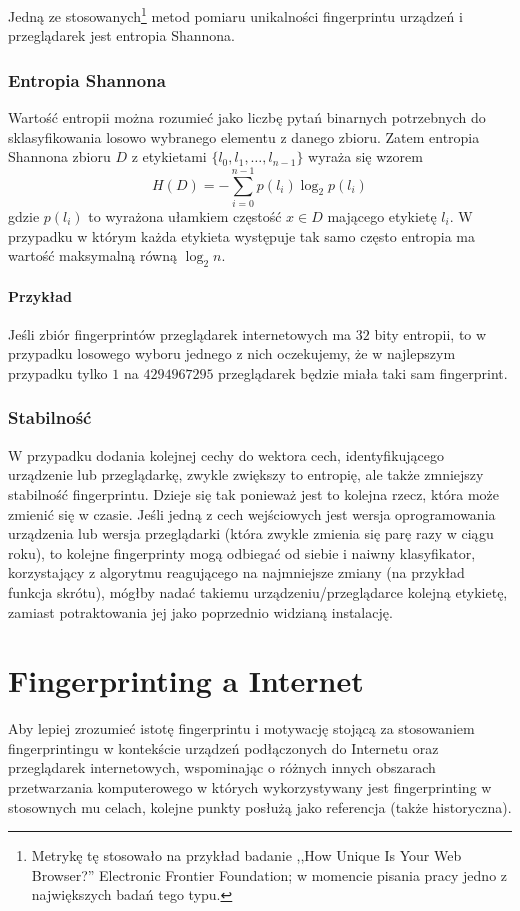 Jedną ze stosowanych\footnote{Metrykę tę stosowało na przykład badanie ,,How
	Unique Is Your Web Browser?'' Electronic Frontier Foundation; w momencie
pisania pracy jedno z największych badań tego typu.} metod pomiaru unikalności
fingerprintu urządzeń i przeglądarek jest entropia Shannona.

\subsubsection{Entropia Shannona}
Wartość entropii można rozumieć jako liczbę pytań binarnych potrzebnych do
sklasyfikowania losowo wybranego elementu z danego zbioru. Zatem entropia
Shannona zbioru \(D\) z etykietami \(\{l_{0}, l_{1}, \dots, l_{n - 1}\}\) wyraża
się wzorem \[H(D) = -{\sum_{i = 0}^{n - 1}{p(l_{i})\log_{2}{p(l_{i})}}}\] gdzie
\(p(l_{i})\) to wyrażona ułamkiem częstość \(x \in D\) mającego etykietę
\(l_{i}\). W przypadku w którym każda etykieta występuje tak samo często
entropia ma wartość maksymalną równą \(\log_{2}{n}\).

\paragraph{Przykład}
Jeśli zbiór fingerprintów przeglądarek internetowych ma \(32\) bity entropii, to
w przypadku losowego wyboru jednego z nich oczekujemy, że w najlepszym przypadku
tylko \(1\) na \(4294967295\) przeglądarek będzie miała taki sam fingerprint.

\subsubsection{Stabilność}
W przypadku dodania kolejnej cechy do wektora cech, identyfikującego urządzenie
lub przeglądarkę, zwykle zwiększy to entropię, ale także zmniejszy stabilność
fingerprintu. Dzieje się tak ponieważ jest to kolejna rzecz, która może zmienić
się w czasie. Jeśli jedną z cech wejściowych jest wersja oprogramowania
urządzenia lub wersja przeglądarki (która zwykle zmienia się parę razy w ciągu
roku), to kolejne fingerprinty mogą odbiegać od siebie i naiwny klasyfikator,
korzystający z algorytmu reagującego na najmniejsze zmiany (na przykład funkcja
skrótu), mógłby nadać takiemu urządzeniu/przeglądarce kolejną etykietę, zamiast
potraktowania jej jako poprzednio widzianą instalację.

\section{Fingerprinting a Internet} %
Aby lepiej zrozumieć istotę fingerprintu i motywację stojącą za stosowaniem
fingerprintingu w kontekście urządzeń podłączonych do Internetu oraz
przeglądarek internetowych, wspominając o różnych innych obszarach przetwarzania
komputerowego w których wykorzystywany jest fingerprinting w stosownych mu
celach, kolejne punkty posłużą jako referencja (także historyczna).

